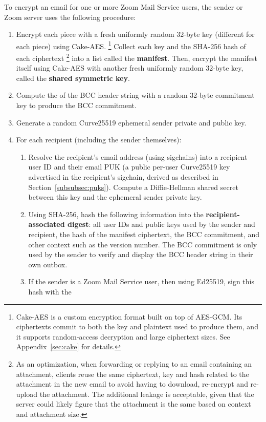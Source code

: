 To encrypt an email for one or more Zoom Mail Service users, the sender or Zoom server uses the
following procedure:
\begin{enumerate}
\item Encrypt each piece with a fresh uniformly random 32-byte key (different for each piece) using
Cake-AES.%
%
\footnote{Cake-AES is a custom encryption format built on top of AES-GCM. Its ciphertexts commit to
both the key and plaintext used to produce them, and it supports random-access decryption and large
ciphertext sizes. See Appendix~\ref{sec:cake} for details.} %
%
Collect each key and the SHA-256 hash of each ciphertext%
%
\footnote{As an optimization, when forwarding or replying to an email containing an attachment,
clients reuse the same ciphertext, key and hash related to the attachment in the new email to avoid
having to download, re-encrypt and re-upload the attachment. The additional leakage is acceptable,
given that the server could likely figure that the attachment is the same based on context and
attachment size.}
%
into a list called the \textbf{manifest}. Then, encrypt the manifest itself using Cake-AES with
another fresh uniformly random 32-byte key, called the \textbf{shared symmetric key}.
\item Compute the \HMACSHATWO of the BCC header string with a random 32-byte commitment key to
produce the BCC commitment.
\item Generate a random Curve25519 ephemeral sender private and public key.
\item For each recipient (including the sender themselves):
\begin{enumerate}
\item Resolve the recipient's email address (using sigchains) into a recipient user ID and their
email PUK (a public per-user Curve25519 key advertised in the recipient's sigchain, derived as
described in Section~\ref{subsubsec:puks}). Compute a Diffie-Hellman shared secret between this key
and the ephemeral sender private key.
\item Using SHA-256, hash the following information into the
\textbf{recipient-associated digest}: all user IDs and public keys used by the
sender and recipient, the hash of the manifest ciphertext, the BCC commitment,
and other context such as the version number. The BCC commitment is
only used by the sender to verify and display the BCC header string in their own outbox.
\item If the sender is a Zoom Mail Service user, then using Ed25519, sign this hash with the

\end{enumerate}
\end{enumerate}
